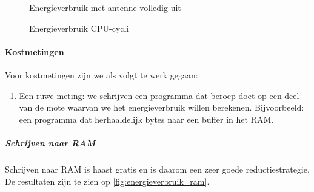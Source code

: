 \documentclass{article}
\begin{document}
\begin{figure}[h]
\centering
\caption{Energieverbruik met antenne volledig uit}
\label{fig:energieverbruik_antenne_uit}
\end{figure}

\begin{figure}[h]
\centering

\caption{Energieverbruik CPU-cycli}
\label{fig:energieverbruik_cpu}
\end{figure}

\paragraph{Kostmetingen}

Voor kostmetingen zijn we als volgt te werk gegaan:

\begin{enumerate}
\item Een ruwe meting: we schrijven een programma dat beroep doet op een deel
van de mote waarvan we het energieverbruik willen berekenen. Bijvoorbeeld: een
programma dat herhaaldelijk bytes naar een buffer in het RAM. 
\end{enumerate}

\subparagraph{Schrijven naar RAM}

Schrijven naar RAM is haast gratis en is daarom een zeer goede
reductiestrategie. De resultaten zijn te zien op \ref{fig:energieverbruik_ram}.
\end{document}
